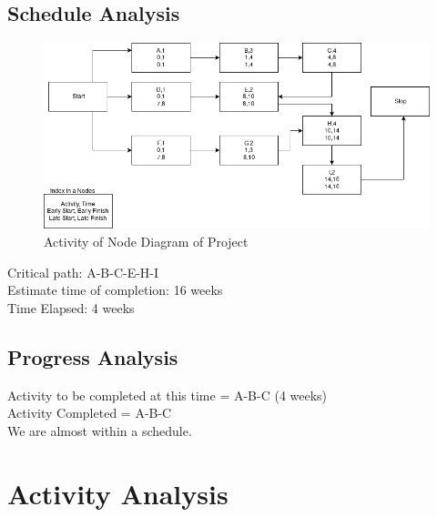 \documentclass[a4paper, 12pt, onepage]{article}
\begin{document}
      \subsection{Schedule Analysis}
      \begin{figure}[ht!]
	      \includegraphics[width=450px]{aschedule.png}
	      \caption{Activity of Node Diagram of Project}
	\end{figure}
	\hfill \break
	Critical path: A-B-C-E-H-I\\
	Estimate time of completion: 16 weeks\\
	Time Elapsed: 4 weeks
	\subsection{Progress Analysis}
	Activity to be completed at this time = A-B-C (4 weeks)\\
	Activity Completed = A-B-C\\
	We are almost within a schedule.

      \section{Activity Analysis}
\end{document}

